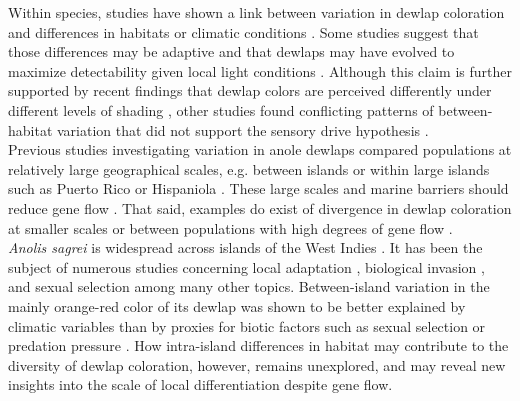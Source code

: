 Within species, studies have shown a link between variation in dewlap coloration and differences in habitats or climatic conditions \citep{Macedonia2001, Leal2002, Thorpe2002, Thorpe2002a, Leal2004, Vanhooydonck2009, Ng2012, Ng2013, Ng2016, Vanhooydonck2009, Driessens2017}. Some studies suggest that those differences may be adaptive and that dewlaps may have evolved to maximize detectability given local light conditions \citep{Fleishman2001, Leal2002, Leal2004}. Although this claim is further supported by recent findings that dewlap colors are perceived differently under different levels of shading \citep{Fleishman2020}, other studies found conflicting patterns of between-habitat variation that did not support the sensory drive hypothesis \citep{Fleishman2009, Ng2012, Macedonia2014}.\\ 

Previous studies investigating variation in anole dewlaps compared populations at relatively large geographical scales, e.g. between islands \citep{Vanhooydonck2009, Driessens2017} or within large islands such as Puerto Rico \citep{Leal2004} or Hispaniola \citep{Ng2012, Ng2016}. These large scales and marine barriers should reduce gene flow \citep{Ng2011, Lambert2013, Richardson2014, Ng2017}. That said, examples do exist of divergence in dewlap coloration at smaller scales or between populations with high degrees of gene flow \citep{Thorpe2002, Thorpe2002a, Stapley2011, Ng2016}.\\

\textit{Anolis sagrei} is widespread across islands of the West Indies \citep{Reynolds2020}. It has been the subject of numerous studies concerning local adaptation \citep{Losos1994, Losos1997a, Losos2001, Kolbe2012}, biological invasion \citep{Kolbe2008}, and sexual selection \citep{Tokarz2002, Tokarz2005, Tokarz2006, Driessens2014, Steffen2014, Driessens2015} among many other topics. Between-island variation in the mainly orange-red color of its dewlap was shown to be better explained by climatic variables \citep{Driessens2017} than by proxies for biotic factors such as sexual selection or predation pressure \citep{Vanhooydonck2009, Baeckens2018}. How intra-island differences in habitat may contribute to the diversity of dewlap coloration, however, remains unexplored, and may reveal new insights into the scale of local differentiation despite gene flow.\\


